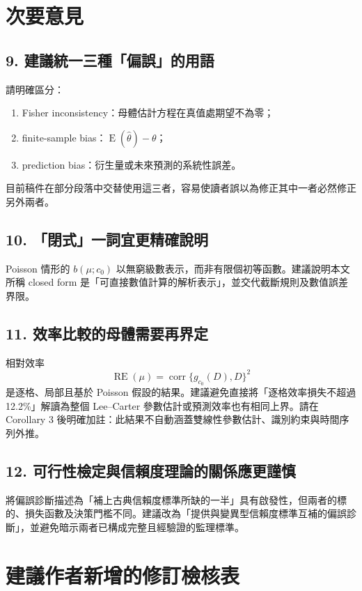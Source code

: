 \documentclass[12pt,a4paper]{article}
\begin{document}
\section*{次要意見}

\subsection*{9. 建議統一三種「偏誤」的用語}

請明確區分：
\begin{enumerate}
  \item Fisher inconsistency：母體估計方程在真值處期望不為零；
  \item finite-sample bias：$\operatorname{E}(\widehat\theta)-\theta$；
  \item prediction bias：衍生量或未來預測的系統性誤差。
\end{enumerate}
目前稿件在部分段落中交替使用這三者，容易使讀者誤以為修正其中一者必然修正另外兩者。

\subsection*{10. 「閉式」一詞宜更精確說明}

Poisson 情形的 $b(\mu;c_0)$ 以無窮級數表示，而非有限個初等函數。建議說明本文所稱 closed form 是「可直接數值計算的解析表示」，並交代截斷規則及數值誤差界限。

\subsection*{11. 效率比較的母體需要再界定}

相對效率
\[
\operatorname{RE}(\mu)=\operatorname{corr}\{g_{c_0}(D),D\}^2
\]
是逐格、局部且基於 Poisson 假設的結果。建議避免直接將「逐格效率損失不超過 12.2\%」解讀為整個 Lee--Carter 參數估計或預測效率也有相同上界。請在 Corollary 3 後明確加註：此結果不自動涵蓋雙線性參數估計、識別約束與時間序列外推。

\subsection*{12. 可行性檢定與信賴度理論的關係應更謹慎}

將偏誤診斷描述為「補上古典信賴度標準所缺的一半」具有啟發性，但兩者的標的、損失函數及決策門檻不同。建議改為「提供與變異型信賴度標準互補的偏誤診斷」，並避免暗示兩者已構成完整且經驗證的監理標準。

\section*{建議作者新增的修訂檢核表}
\end{document}
